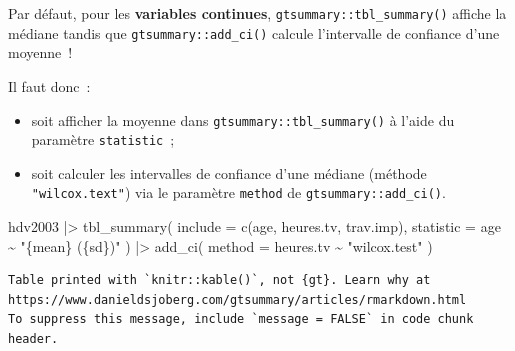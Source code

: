 \documentclass[
  letterpaper,
  DIV=11,
  numbers=noendperiod,
  oneside]{scrreprt}
\newenvironment{Shaded}{\begin{snugshade}}{\end{snugshade}}
\newcommand{\AttributeTok}[1]{\textcolor[rgb]{0.40,0.45,0.13}{#1}}
\newcommand{\FunctionTok}[1]{\textcolor[rgb]{0.28,0.35,0.67}{#1}}
\newcommand{\NormalTok}[1]{\textcolor[rgb]{0.00,0.23,0.31}{#1}}
\newcommand{\SpecialCharTok}[1]{\textcolor[rgb]{0.37,0.37,0.37}{#1}}
\newcommand{\StringTok}[1]{\textcolor[rgb]{0.13,0.47,0.30}{#1}}
\providecommand{\tightlist}{%
  \setlength{\itemsep}{0pt}\setlength{\parskip}{0pt}}\usepackage{longtable,booktabs,array}
\begin{document}
\begin{tcolorbox}[enhanced jigsaw, colbacktitle=quarto-callout-warning-color!10!white, opacityback=0, toprule=.15mm, colback=white, coltitle=black, bottomtitle=1mm, toptitle=1mm, titlerule=0mm, rightrule=.15mm, title=\textcolor{quarto-callout-warning-color}{\faExclamationTriangle}\hspace{0.5em}{Avertissement}, breakable, bottomrule=.15mm, opacitybacktitle=0.6, arc=.35mm, left=2mm, leftrule=.75mm, colframe=quarto-callout-warning-color-frame]

Par défaut, pour les \textbf{variables continues},
\texttt{gtsummary::tbl\_summary()} affiche la médiane tandis que
\texttt{gtsummary::add\_ci()} calcule l'intervalle de confiance d'une
moyenne~!

Il faut donc~:

\begin{itemize}
\tightlist
\item
  soit afficher la moyenne dans \texttt{gtsummary::tbl\_summary()} à
  l'aide du paramètre \texttt{statistic}~;
\item
  soit calculer les intervalles de confiance d'une médiane (méthode
  \texttt{"wilcox.text"}) via le paramètre \texttt{method} de
  \texttt{gtsummary::add\_ci()}.
\end{itemize}

\end{tcolorbox}

\begin{Shaded}
\begin{Highlighting}[]
\NormalTok{hdv2003 }\SpecialCharTok{|\textgreater{}}
  \FunctionTok{tbl\_summary}\NormalTok{(}
    \AttributeTok{include =} \FunctionTok{c}\NormalTok{(age, heures.tv, trav.imp),}
    \AttributeTok{statistic =}\NormalTok{ age }\SpecialCharTok{\textasciitilde{}} \StringTok{"\{mean\} (\{sd\})"}
\NormalTok{  ) }\SpecialCharTok{|\textgreater{}} 
  \FunctionTok{add\_ci}\NormalTok{(}
    \AttributeTok{method =}\NormalTok{ heures.tv }\SpecialCharTok{\textasciitilde{}} \StringTok{"wilcox.test"}
\NormalTok{  )}
\end{Highlighting}
\end{Shaded}

\begin{verbatim}
Table printed with `knitr::kable()`, not {gt}. Learn why at
https://www.danieldsjoberg.com/gtsummary/articles/rmarkdown.html
To suppress this message, include `message = FALSE` in code chunk header.
\end{verbatim}
\end{document}
